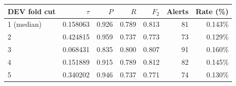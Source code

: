 \begin{tabular}{@{}l r r r r r r@{}}
\toprule
DEV fold cut & $\tau$ & $P$ & $R$ & $F_2$ & Alerts & Rate (\%) \\
\midrule
1 (median) & 0.158063 & 0.926 & 0.789 & 0.813 & 81 & 0.143\% \\
2 & 0.424815 & 0.959 & 0.737 & 0.773 & 73 & 0.129\% \\
3 & 0.068431 & 0.835 & 0.800 & 0.807 & 91 & 0.160\% \\
4 & 0.151889 & 0.915 & 0.789 & 0.812 & 82 & 0.145\% \\
5 & 0.340202 & 0.946 & 0.737 & 0.771 & 74 & 0.130\% \\
\bottomrule
\end{tabular}
